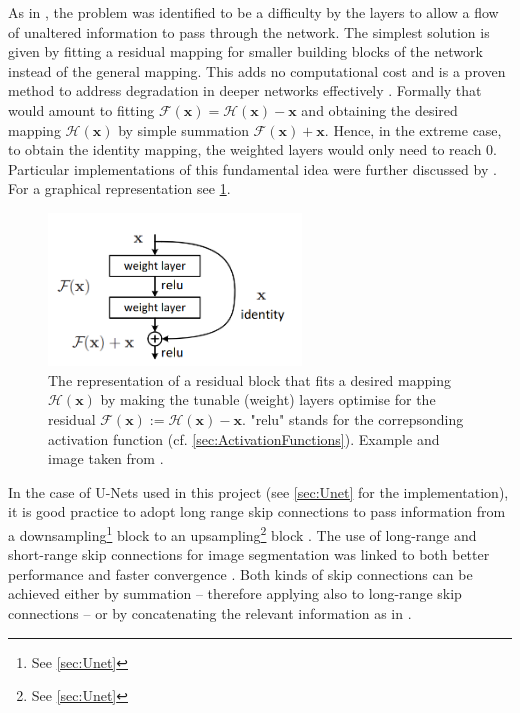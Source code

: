 As in \citet{He2016DeepRecognition,Srivastava2015HighwayNetworks}, the problem was identified to be a difficulty by the layers to allow a flow of unaltered information to pass through the network. The simplest solution is given by fitting a residual mapping for smaller building blocks of the network instead of the general mapping. This adds no computational cost and is a proven method to address degradation in deeper networks effectively \citep{He2016DeepRecognition}. Formally that would amount to fitting $\mathcal{F}(\bm{x}) = \mathcal{H}(\bm{x}) - \bm{x}$ and obtaining the desired mapping $\mathcal{H}(\bm{x})$ by simple summation $\mathcal{F}(\bm{x}) + \bm{x}$. Hence, in the extreme case, to obtain the identity mapping, the weighted layers would only need to reach $0$. Particular implementations of this fundamental idea were further discussed by \citet{He2016IdentityNetworks}. For a graphical representation see \cref{fig:ResMap}.
\begin{figure}[!h]
    \centering
    \includegraphics[width=0.6\textwidth]{ResMap.png}
    \caption{The representation of a residual block that fits a desired mapping $\mathcal{H}(\bm{x})$ by making the tunable (weight) layers optimise for the residual $\mathcal{F}(\bm{x}):=\mathcal{H}(\bm{x}) - \bm{x}$. "relu" stands for the correpsonding activation function (cf. \cref{sec:ActivationFunctions}). Example and image taken from \citet{He2016DeepRecognition}.}
    \label{fig:ResMap}
\end{figure}

In the case of U-Nets used in this project (see \cref{sec:Unet} for the implementation), it is good practice to adopt long range skip connections to pass information from a downsampling\footnote{See \cref{sec:Unet}} block to an upsampling\footnote{See \cref{sec:Unet}} block \citep{Drozdzal2016TheSegmentation}. The use of long-range and short-range skip connections for image segmentation was linked to both better performance and faster convergence \citep{Drozdzal2016TheSegmentation}. Both kinds of skip connections can be achieved either by summation -- therefore applying \citet{He2016DeepRecognition} also to long-range skip connections -- or by concatenating the relevant information as in \citet{Shelhamer2017FullySegmentation}.

